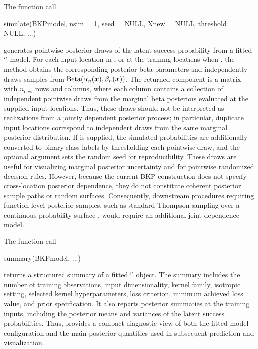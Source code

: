 \documentclass[article, shortnames]{jss}
\newcommand{\class}[1]{`\code{#1}'}
\newcommand{\fct}[1]{\code{#1()}}
\renewcommand{\vec}[1]{\mbox{\boldmath ${#1}$}}
\begin{document}
The function call
\begin{Code}
simulate(BKPmodel, nsim = 1, seed = NULL, Xnew = NULL, threshold = NULL, ...)
\end{Code}
generates pointwise posterior draws of the latent success probability from a fitted \class{BKP} model. For each input location in , or at the training locations when , the method obtains the corresponding posterior beta parameters and independently draws  samples from $\mathrm{Beta}(\alpha_n(\vec{x}), \beta_n(\vec{x}))$. The returned  component is a matrix with $n_{\mathrm{new}}$ rows and  columns, where each column contains a collection of independent pointwise draws from the marginal beta posteriors evaluated at the supplied input locations. Thus, these draws should not be interpreted as realizations from a jointly dependent posterior process; in particular, duplicate input locations correspond to independent draws from the same marginal posterior distribution. If  is supplied, the simulated probabilities are additionally converted to binary class labels by thresholding each pointwise draw, and the optional  argument sets the random seed for reproducibility. These draws are useful for visualizing marginal posterior uncertainty and for pointwise randomized decision rules. However, because the current BKP construction does not specify cross-location posterior dependence, they do not constitute coherent posterior sample paths or random surfaces. Consequently, downstream procedures requiring function-level posterior samples, such as standard Thompson sampling over a continuous probability surface \citep{Garnett2023BO}, would require an additional joint dependence model.

The function call
\begin{Code}
summary(BKPmodel, ...)
\end{Code}
returns a structured summary of a fitted \class{BKP} object. The summary includes the number of training observations, input dimensionality, kernel family, isotropic setting, selected kernel hyperparameters, loss criterion, minimum achieved loss value, and prior specification. It also reports posterior summaries at the training inputs, including the posterior means and variances of the latent success probabilities. Thus, \fct{summary} provides a compact diagnostic view of both the fitted model configuration and the main posterior quantities used in subsequent prediction and visualization.
\end{document}
